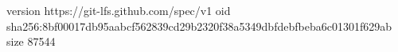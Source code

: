 version https://git-lfs.github.com/spec/v1
oid sha256:8bf00017db95aabcf562839cd29b2320f38a5349dbfdebfbeba6c01301f629ab
size 87544
